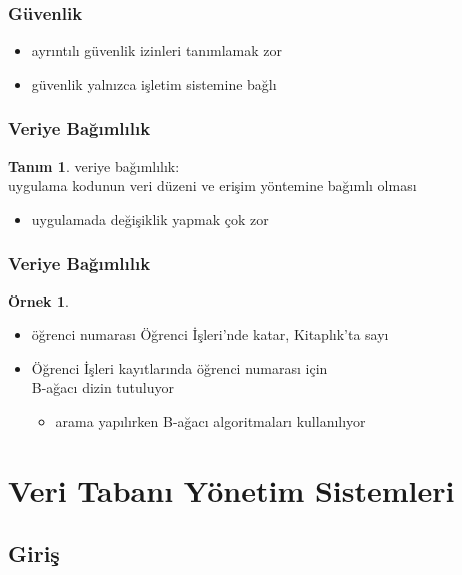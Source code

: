 \documentclass[dvipsnames]{beamer}
\theoremstyle{definition}
\newtheorem{tanim}[theorem]{Tanım}
\theoremstyle{example}
\newtheorem{ornek}[theorem]{Örnek}
\theoremstyle{plain}
\begin{document}
\begin{frame}
  \frametitle{Güvenlik}

  \begin{itemize}
    \item ayrıntılı güvenlik izinleri tanımlamak zor
    \item güvenlik yalnızca işletim sistemine bağlı
  \end{itemize}
\end{frame}

\begin{frame}
  \frametitle{Veriye Bağımlılık}

  \begin{tanim}
    \alert{veriye bağımlılık}:\\
      uygulama kodunun veri düzeni ve erişim yöntemine bağımlı olması

    \begin{itemize}
      \item uygulamada değişiklik yapmak çok zor
    \end{itemize}
  \end{tanim}
\end{frame}

\begin{frame}
  \frametitle{Veriye Bağımlılık}

  \begin{ornek}
    \begin{itemize}
      \item öğrenci numarası Öğrenci İşleri'nde katar, Kitaplık'ta sayı

      \pause
      \medskip
      \item Öğrenci İşleri kayıtlarında öğrenci numarası için\\
	B-ağacı dizin tutuluyor
      \begin{itemize}
	\item arama yapılırken B-ağacı algoritmaları kullanılıyor
      \end{itemize}
    \end{itemize}
  \end{ornek}
\end{frame}

\section{Veri Tabanı Yönetim Sistemleri}

\subsection{Giriş}
\end{document}
